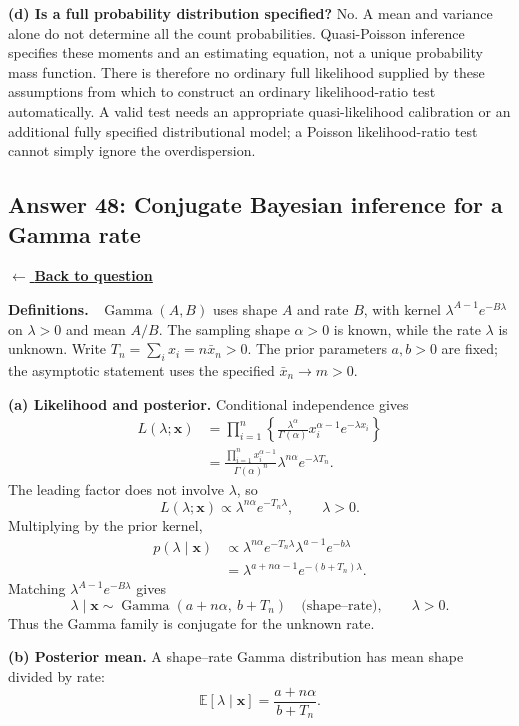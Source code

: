 \documentclass[11pt,a4paper]{article}
\newcommand{\given}{\mathrel{|}}
\newcommand{\xvec}{\boldsymbol{x}}
\newcommand{\E}{\mathbb{E}}
\newcommand{\answernav}[1]{%
  \label{answer:#1}%
  \noindent\hyperref[question:#1]{$\leftarrow$ \textbf{Back to question}}%
  \par\smallskip}
\newcommand{\studyheading}[1]{%
  \par\medskip\noindent\textcolor{statblue}{\textbf{#1.}}\ }
\begin{document}
\textbf{(d) Is a full probability distribution specified?}
No. A mean and variance alone do not determine all the count probabilities.
Quasi-Poisson inference specifies these moments and an estimating equation,
not a unique probability mass function. There is therefore no ordinary
full likelihood supplied by these assumptions from which to construct an
ordinary likelihood-ratio test automatically. A valid test needs an
appropriate quasi-likelihood calibration or an additional fully specified
distributional model; a Poisson likelihood-ratio test cannot simply ignore
the overdispersion.

\clearpage

\subsection{Answer 48: Conjugate Bayesian inference for a Gamma rate}
\answernav{48}

\studyheading{Definitions}
$\operatorname{Gamma}(A,B)$ uses shape $A$ and rate $B$, with kernel
$\lambda^{A-1}e^{-B\lambda}$ on $\lambda>0$ and mean $A/B$.
The sampling shape $\alpha>0$ is known, while the rate $\lambda$ is unknown.
Write $T_n=\sum_i x_i=n\bar x_n>0$.
The prior parameters $a,b>0$ are fixed; the asymptotic statement uses the specified $\bar x_n\to m>0$.

\textbf{(a) Likelihood and posterior.}
Conditional independence gives
\begin{align*}
L(\lambda;\xvec)
&=\prod_{i=1}^n
\left\{\frac{\lambda^\alpha}{\Gamma(\alpha)}
x_i^{\alpha-1}e^{-\lambda x_i}\right\}\\
&=\frac{\prod_{i=1}^n x_i^{\alpha-1}}{\Gamma(\alpha)^n}
\lambda^{n\alpha}e^{-\lambda T_n}.
\end{align*}
The leading factor does not involve $\lambda$, so
\[
\boxed{L(\lambda;\xvec)\propto\lambda^{n\alpha}e^{-T_n\lambda},
\qquad\lambda>0.}
\]
Multiplying by the prior kernel,
\begin{align*}
p(\lambda\given\xvec)
&\propto\lambda^{n\alpha}e^{-T_n\lambda}
\lambda^{a-1}e^{-b\lambda}\\
&=\lambda^{a+n\alpha-1}e^{-(b+T_n)\lambda}.
\end{align*}
Matching $\lambda^{A-1}e^{-B\lambda}$ gives
\[
\boxed{\lambda\given\xvec\sim
\operatorname{Gamma}(a+n\alpha,\ b+T_n)
\quad\text{(shape--rate)},\qquad\lambda>0.}
\]
Thus the Gamma family is conjugate for the unknown rate.

\textbf{(b) Posterior mean.}
A shape--rate Gamma distribution has mean shape divided by rate:
\[
\boxed{\E[\lambda\given\xvec]=\frac{a+n\alpha}{b+T_n}.}
\]
\end{document}
